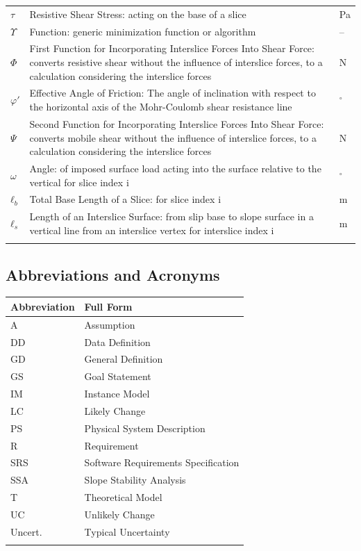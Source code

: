 \documentclass[12pt]{article}
\begin{document}
\begin{longtabu}{l X[l] l}
\\
$τ$ & Resistive Shear Stress: acting on the base of a slice & Pa
\\
$Υ$ & Function: generic minimization function or algorithm & --
\\
$Φ$ & First Function for Incorporating Interslice Forces Into Shear Force: converts resistive shear without the influence of interslice forces, to a calculation considering the interslice forces & N
\\
$φ'$ & Effective Angle of Friction: The angle of inclination with respect to the horizontal axis of the Mohr-Coulomb shear resistance line & ${}^{\circ}$
\\
$Ψ$ & Second Function for Incorporating Interslice Forces Into Shear Force: converts mobile shear without the influence of interslice forces, to a calculation considering the interslice forces & N
\\
$ω$ & Angle: of imposed surface load acting into the surface relative to the vertical for slice index i & ${}^{\circ}$
\\
${ℓ_{b}}$ & Total Base Length of a Slice: for slice index i & m
\\
${ℓ_{s}}$ & Length of an Interslice Surface: from slip base to slope surface in a vertical line from an interslice vertex for interslice index i & m
\\
\bottomrule
\label{Table:ToS}
\end{longtabu}
\subsection{Abbreviations and Acronyms}
\label{Sec:TAbbAcc}
\begin{longtable*}{l l}
\toprule
Abbreviation & Full Form
\\
\midrule
A & Assumption
\\
DD & Data Definition
\\
GD & General Definition
\\
GS & Goal Statement
\\
IM & Instance Model
\\
LC & Likely Change
\\
PS & Physical System Description
\\
R & Requirement
\\
SRS & Software Requirements Specification
\\
SSA & Slope Stability Analysis
\\
T & Theoretical Model
\\
UC & Unlikely Change
\\
Uncert. & Typical Uncertainty
\\
\bottomrule
\label{Table:TAbbAcc}
\end{longtable*}
\end{document}
